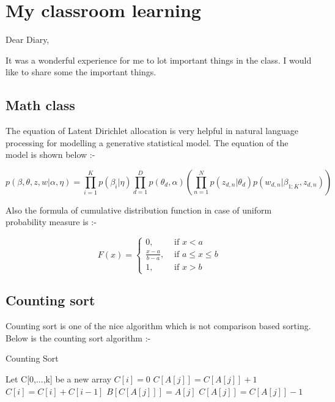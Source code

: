 \chapter{My classroom learning}
Dear Diary,

It was a wonderful experience for me to lot important things in the class. I would like
to share some the important things.

\section{Math class}
The equation of Latent Dirichlet allocation is very helpful in natural language processing
for modelling a generative statistical model. The equation of the model is shown below
:-

\begin{equation}
p(\beta ,\theta ,z,w|\alpha ,\eta )=\prod_{i=1}^{K}p(\beta _{i}|\eta )\prod_{d=1}^{D}p(\theta _{d},\alpha )(\prod_{n=1}^{N}p(z_{d,n}|\theta _{d})p(w_{d,n}|\beta _{1:K},z_{d,n}))
\end{equation}

Also the formula of cumulative distribution function in case of uniform probability measure is :-

\begin{equation}
F(x)=\begin{cases}
0, & \text{ if } x<a \\ 
\frac{x-a}{b-a}, & \text{ if } a\leq x\leq b \\ 
1, & \text{ if } x>b 
\end{cases}
\end{equation}

\section{Counting sort}
Counting sort is one of the nice algorithm which is not comparison based sorting. Below
is the counting sort algorithm :-

\begin{algorithm}
    \caption{Counting Sort}
    \begin{algorithmic}[1] %
        	\State Let C[0,...,k] be a new array
                \State $C[i] = 0$ 
            \EndFor
                \State $C[A[j]] = C[A[j]] + 1$ 
            \EndFor
                \State $C[i] = C[i] + C[i − 1]$
            \EndFor
                \State $B[C[A[j]]] = A[j]$
				\State $C[A[j]] = C[A[j]] − 1$
            \EndFor
        \EndProcedure
    \end{algorithmic}
\end{algorithm}
